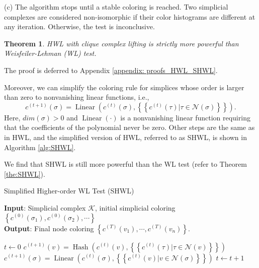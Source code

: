 \documentclass[letterpaper]{article} \usepackage{aaai24}
\newcommand \multiset[1] {\left\{\!\!\left\{#1\right\}\!\!\right\} }
\theoremstyle{plain}
\newtheorem{theorem}{Theorem}[section]
\theoremstyle{definition}
\theoremstyle{remark}
\begin{document}
(c) The algorithm stops until a stable coloring is reached. Two simplicial complexes are considered non-isomorphic if their color histograms are different at any iteration. Otherwise, the test is inconclusive.

\begin{theorem}
\label{the:HWL}
HWL with clique complex lifting is strictly more powerful than Weisfeiler-Lehman (WL) test.
\end{theorem}

The proof is deferred to Appendix \ref{appendix: proofs_HWL_SHWL}.

Moreover, we can simplify the coloring rule for simplices whose order is larger than zero to nonvanishing linear functions, i.e.,
\begin{equation}
    c^{(t+1)}(\sigma) = \operatorname{Linear}\left(c^{(t)}(\sigma), \multiset{c^{(t)}(\tau)|\tau \in \mathcal{N}(\sigma) } \right).
\end{equation}
Here, $dim(\sigma)>0$ and $\operatorname{Linear}(\cdot)$ is a nonvanishing linear function requiring that the coefficients of the polynomial never be zero. Other steps are the same as in HWL, and the simplified version of HWL, referred to as SHWL, is shown in Algorithm \ref{alg:SHWL}.


We find that SHWL is still more powerful than the WL test (refer to Theorem \ref{the:SHWL}). 


\begin{algorithm}[htp] 
\caption{Simplified Higher-order WL Test (SHWL)}
\textbf{Input}: Simplicial complex $\mathcal{K}$, initial simplicial coloring $\left\{c^{(0)}(\sigma_1), c^{(0)}(\sigma_2), \cdots \right\}$ \\
\textbf{Output}: Final node coloring $\left\{c^{(T)}(v_1), \cdots, c^{(T)}(v_n)\right\}$.
\vspace{-1em} \begin{algorithmic}[1]\STATE $t \leftarrow 0$ 
\REPEAT
    \STATE $c^{(t+1)}(v) = \operatorname{Hash}\left(c^{(t)}(v), \multiset{c^{(t)}(\tau)|\tau \in \mathcal{N}(v) } \right)$ \ENDFOR
    \STATE $c^{(t+1)}(\sigma) = \operatorname{Linear}\left(c^{(t)}(\sigma), \multiset{c^{(t)}(v)| v \in \mathcal{N}(\sigma) } \right)$ \ENDFOR
    \STATE $t \leftarrow t+1$
\end{algorithmic}
\label{alg:SHWL}
\end{algorithm}
\end{document}
